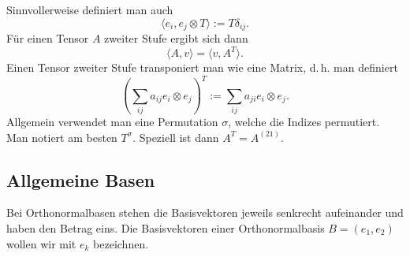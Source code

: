 \documentclass[a4paper,10pt,fleqn,twocolumn,twoside]{article}
\numberwithin{equation}{section}
\begin{document}
Sinnvollerweise definiert man auch
\begin{equation}
\langle e_i,e_j\otimes T\rangle := T\delta_{ij}.
\end{equation}
Für einen Tensor $A$ zweiter Stufe ergibt sich dann
\begin{equation}
\langle A,v\rangle = \langle v,A^T\rangle.
\end{equation}
Einen Tensor zweiter Stufe transponiert man wie eine Matrix, d.\,h. man definiert
\begin{equation}
(\sum_{ij}a_{ij}e_i\otimes e_j)^T:=\sum_{ij} a_{ji}e_i\otimes e_j.
\end{equation}
Allgemein verwendet man eine Permutation $\sigma$, welche die
Indizes permutiert. Man notiert am besten $T^\sigma$. Speziell
ist dann $A^T=A^{(21)}$.


\subsection{Allgemeine Basen}

Bei Orthonormalbasen stehen die Basisvektoren jeweils senkrecht
aufeinander und haben den Betrag eins. Die Basisvektoren einer
Orthonormalbasis $B=(e_1,e_2)$ wollen wir mit $e_k$ bezeichnen.
\end{document}
